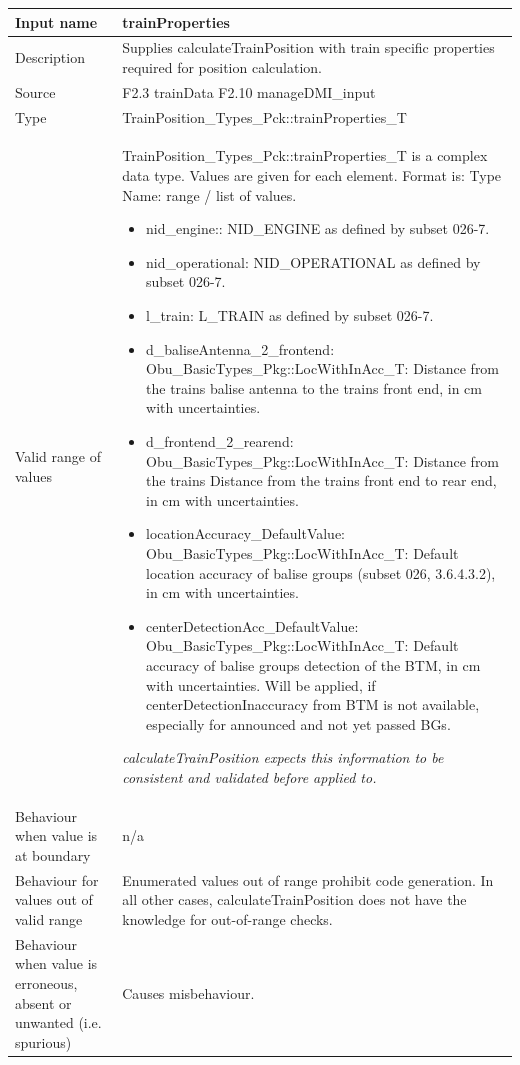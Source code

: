 \begin{longtable}{p{}p{}}
\toprule
Input name				& trainProperties \\
\midrule
Description				& Supplies calculateTrainPosition with train specific properties required for position calculation.   \\
\midrule
Source					& F2.3 trainData\newline
F2.10 manageDMI\_input \\ 
\midrule
Type					& TrainPosition\_Types\_Pck::trainProperties\_T \\  
\midrule
Valid range of values	& TrainPosition\_Types\_Pck::trainProperties\_T is a complex data type. Values are given for each element. Format is: Type Name: range / list of values.
\begin{itemize}
\item nid\_engine:: NID\_ENGINE as defined by subset 026-7. 
\item nid\_operational: NID\_OPERATIONAL as defined by subset 026-7. 
\item l\_train: L\_TRAIN as defined by subset 026-7. 
\item d\_baliseAntenna\_2\_frontend: Obu\_BasicTypes\_Pkg::LocWithInAcc\_T:  Distance from the trains balise antenna to the trains front end, in cm with uncertainties. 
\item d\_frontend\_2\_rearend: Obu\_BasicTypes\_Pkg::LocWithInAcc\_T:  Distance from the trains Distance from the trains front end to rear end, in cm with uncertainties. 
\item locationAccuracy\_DefaultValue: Obu\_BasicTypes\_Pkg::LocWithInAcc\_T:  Default location accuracy of balise groups (subset 026, 3.6.4.3.2), in cm with uncertainties. 
\item centerDetectionAcc\_DefaultValue: Obu\_BasicTypes\_Pkg::LocWithInAcc\_T:  Default  accuracy of balise groups detection of the BTM, in cm with uncertainties. Will be applied, if centerDetectionInaccuracy from BTM is not available, especially for announced and not yet passed BGs. 
\end{itemize} 
\emph{calculateTrainPosition expects this information to be consistent and validated before applied to.}\\
\midrule
Behaviour when value is at boundary	& n/a \\
\midrule
Behaviour for values out of valid range	& Enumerated values out of range prohibit code generation. In all other cases, calculateTrainPosition does not have the knowledge for out-of-range checks. \\
\midrule
Behaviour when value is erroneous, absent or unwanted (i.e. spurious) & Causes misbehaviour.
\\
\bottomrule
\end{longtable}



